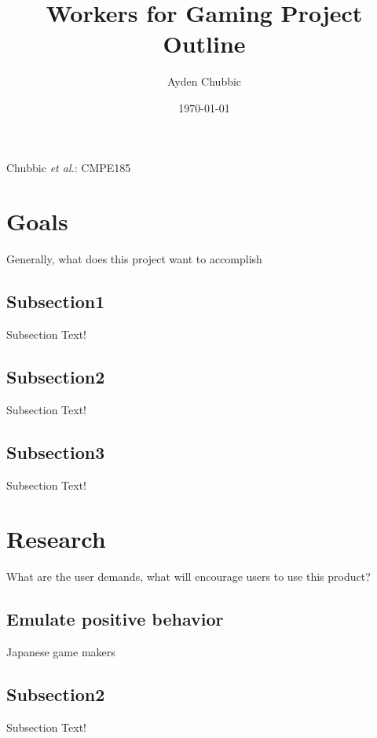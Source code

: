 \documentclass[12pt,journal,compsoc]{IEEEtran}
\begin{document}
\title{Workers for Gaming Project Outline}
\author{Ayden Chubbic}

\date{\today}		

%
{Chubbic \MakeLowercase{\textit{et al.}}: CMPE185}


\maketitle

\section{Goals} Generally, what does this project want to accomplish
    \subsection{Subsection1}Subsection Text!
    \subsection{Subsection2}Subsection Text!
    \subsection{Subsection3}Subsection Text!
    
\section{Research} What are the user demands, what will encourage users to use this product?
    \subsection{Emulate positive behavior}Japanese game makers
    \subsection{Subsection2}Subsection Text!
\end{document}

